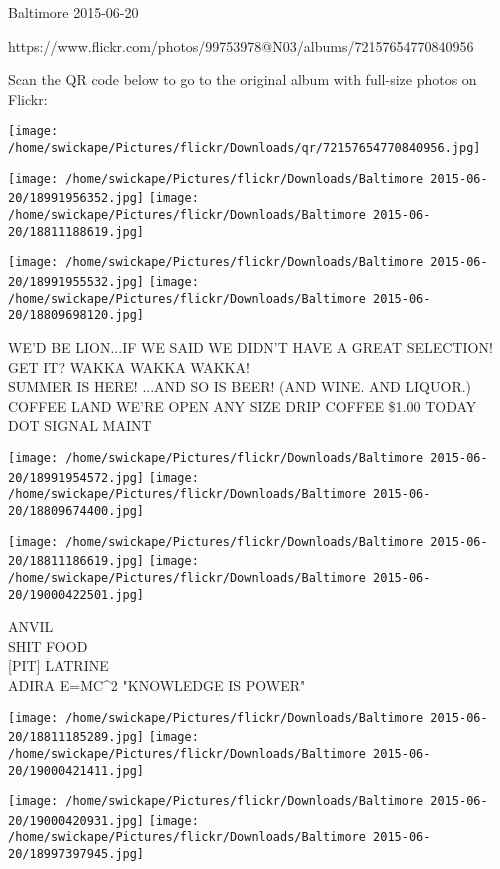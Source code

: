 \documentclass[10pt,letterpaper]{article}
\begin{document}
Baltimore 2015-06-20

https://www.flickr.com/photos/99753978@N03/albums/72157654770840956

Scan the QR code below to go to the original album with full-size photos on Flickr:

\texttt{[image: /home/swickape/Pictures/flickr/Downloads/qr/72157654770840956.jpg]}
\pagebreak

\texttt{[image: /home/swickape/Pictures/flickr/Downloads/Baltimore 2015-06-20/18991956352.jpg]}
\texttt{[image: /home/swickape/Pictures/flickr/Downloads/Baltimore 2015-06-20/18811188619.jpg]}

\texttt{[image: /home/swickape/Pictures/flickr/Downloads/Baltimore 2015-06-20/18991955532.jpg]}
\texttt{[image: /home/swickape/Pictures/flickr/Downloads/Baltimore 2015-06-20/18809698120.jpg]}

WE'D BE LION...IF WE SAID WE DIDN'T HAVE A GREAT SELECTION!  GET IT?  WAKKA WAKKA WAKKA!\\
SUMMER IS HERE!  ...AND SO IS BEER!  (AND WINE.  AND LIQUOR.)\\
COFFEE LAND WE'RE OPEN ANY SIZE DRIP COFFEE \$1.00 TODAY\\
DOT SIGNAL MAINT
\pagebreak

\texttt{[image: /home/swickape/Pictures/flickr/Downloads/Baltimore 2015-06-20/18991954572.jpg]}
\texttt{[image: /home/swickape/Pictures/flickr/Downloads/Baltimore 2015-06-20/18809674400.jpg]}

\texttt{[image: /home/swickape/Pictures/flickr/Downloads/Baltimore 2015-06-20/18811186619.jpg]}
\texttt{[image: /home/swickape/Pictures/flickr/Downloads/Baltimore 2015-06-20/19000422501.jpg]}

ANVIL\\
SHIT FOOD\\
{[}PIT{]} LATRINE\\
ADIRA E=MC\^{}2 "KNOWLEDGE IS POWER"
\pagebreak

\texttt{[image: /home/swickape/Pictures/flickr/Downloads/Baltimore 2015-06-20/18811185289.jpg]}
\texttt{[image: /home/swickape/Pictures/flickr/Downloads/Baltimore 2015-06-20/19000421411.jpg]}

\texttt{[image: /home/swickape/Pictures/flickr/Downloads/Baltimore 2015-06-20/19000420931.jpg]}
\texttt{[image: /home/swickape/Pictures/flickr/Downloads/Baltimore 2015-06-20/18997397945.jpg]}
\end{document}
